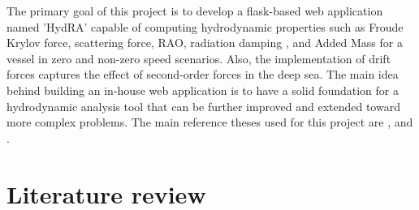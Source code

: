 The primary goal of this project is to develop a flask-based web application named 'HydRA' capable of computing hydrodynamic properties such as Froude Krylov force, scattering force, RAO, radiation damping 
 , and Added Mass for a vessel in zero and non-zero speed scenarios. Also, the implementation of drift forces captures the effect of second-order forces in the deep sea. The main idea behind building an in-house web application is to have a solid foundation for a hydrodynamic analysis tool that can be further improved and extended toward more complex problems. The main reference theses used for this project are \citet{guha2015estimation}, and \cite{guha2012development}.

\section{Literature review}

